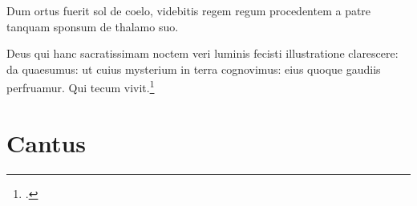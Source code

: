 


Dum ortus fuerit sol de coelo, videbitis regem regum
procedentem a patre tanquam sponsum de thalamo suo.

Deus qui hanc sacratissimam noctem veri luminis fecisti
illustratione clarescere:
da quaesumus: ut cuius mysterium in terra cognovimus:
eius quoque gaudiis perfruamur.
Qui tecum vivit.\footcite[98r]{bp1502}

\section*{Cantus}

